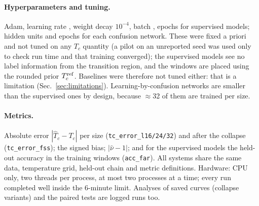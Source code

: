 \paragraph*{Hyperparameters and tuning.} Adam, learning rate , weight decay $10^{-4}$, batch ,  epochs for supervised models;  hidden units and  epochs for each confusion network. These were fixed a priori and not tuned on any $T_c$ quantity (a pilot on an unreported seed was used only to check run time and that training converged); the supervised models see no label information from the transition region, and the windows are placed using the rounded prior $T_c^{\rm ref}$. Baselines were therefore not tuned either: that is a limitation (Sec.~\ref{sec:limitations}). Learning-by-confusion networks are smaller than the supervised ones by design, because $\approx$32 of them are trained per size.

\paragraph*{Metrics.} Absolute error $|\hat T_c-T_c|$ per size (\texttt{tc\_error\_l16/24/32}) and after the collapse (\texttt{tc\_error\_fss}); the signed bias; $|\hat\nu-1|$; and for the supervised models the held-out accuracy in the training windows (\texttt{acc\_far}). All systems share the same data, temperature grid, held-out chain and metric definitions. Hardware: CPU only, two threads per process, at most two processes at a time; every run completed well inside the 6-minute limit. Analyses of saved curves (collapse variants) and the paired tests are logged runs too.
